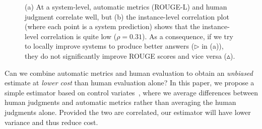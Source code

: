 \begin{figure}[ht]
  \caption{\label{fig:bias-msmarco}
  (a) At a system-level, automatic metrics (ROUGE-L) and human judgment correlate well, but (b) the instance-level correlation plot
  (where each point is a system prediction) shows that the instance-level correlation is quite low ($\rho = 0.31$).
  As a consequence, if we try to locally improve systems to produce better answers ($\triangleright$ in (a)),
  they do not significantly improve ROUGE scores and vice versa ($\vartriangle$).
  }
\end{figure}


Can we combine automatic metrics and human evaluation to obtain
an \emph{unbiased} estimate at \emph{lower cost} than human evaluation alone?
In this paper,
we propose a simple estimator based on control variates~\citep{ripley2009stochastic},
where we average differences between human judgments and automatic metrics
rather than averaging the human judgments alone.
Provided the two are correlated,
our estimator will have lower variance and thus reduce cost.


